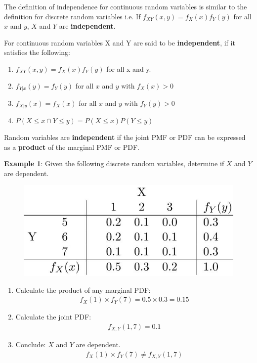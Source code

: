 \documentclass[10pt,a4paper]{article}
\begin{document}
The deﬁnition of independence for continuous random variables is similar to the deﬁnition for
discrete random variables i.e.  If $f_{XY}(x, y) = f_X(x) f_Y(y)$ for all $x$ and $y$, $X$ and $Y$
are \textbf{independent}.

\begin{tcolorbox}[breakable,colback=white]
    For continuous random variables X and Y are said to be \textbf{independent}, if it satisfies the
    following:
    \begin{enumerate}
        \item $f_{XY}(x, y) = f_X(x) f_Y(y)$ for all x and y.
        \item $f_{Y|x}(y) = f_Y(y)$ for all $x$ and $y$ with $f_X(x)>0$
        \item $f_{X|y}(x) = f_X(x)$ for all $x$ and $y$ with $f_Y(y)>0$
        \item $P(X \leq x \cap Y \leq y) = P(X \leq x)P(Y \leq y)$
    \end{enumerate}
\end{tcolorbox}

Random variables are \textbf{independent} if the joint PMF or PDF can be expressed as a \textbf{product} of the
marginal PMF or PDF.

\textbf{Example 1}: Given the following discrete random variables, determine if $X$ and $Y$ are dependent. 
\begin{figure} [h!]
    \centering
    \includegraphics[scale=0.5]{Table.JPG}
\end{figure}
\begin{enumerate}
    \item Calculate the product of any marginal PDF: 
    \begin{align*}
        f_X(1) \times f_Y(7) = 0.5 \times 0.3 = 0.15 
    \end{align*}
    \item Calculate the joint PDF:
    \begin{align*}
        f_{X,Y}(1,7) = 0.1
    \end{align*}
    \item Conclude: $X$ and $Y$ are dependent.
    \begin{align*}
        f_X(1) \times f_Y(7) \neq f_{X,Y}(1,7)
    \end{align*}
\end{enumerate}
\end{document}
